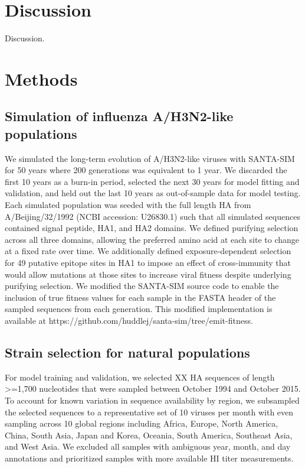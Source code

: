 \section*{Discussion}

Discussion.

\section*{Methods}

\subsection*{Simulation of influenza A/H3N2-like populations}

We simulated the long-term evolution of A/H3N2-like viruses with SANTA-SIM \cite{Jariani2019} for 50 years where 200 generations was equivalent to 1 year.
We discarded the first 10 years as a burn-in period, selected the next 30 years for model fitting and validation, and held out the last 10 years as out-of-sample data for model testing.
Each simulated population was seeded with the full length HA from A/Beijing/32/1992 (NCBI accession: U26830.1) such that all simulated sequences contained signal peptide, HA1, and HA2 domains.
We defined purifying selection across all three domains, allowing the preferred amino acid at each site to change at a fixed rate over time.
We additionally defined exposure-dependent selection for 49 putative epitope sites in HA1 \cite{Luksza:2014hj} to impose an effect of cross-immunity that would allow mutations at those sites to increase viral fitness despite underlying purifying selection.
We modified the SANTA-SIM source code to enable the inclusion of true fitness values for each sample in the FASTA header of the sampled sequences from each generation.
This modified implementation is available at https://github.com/huddlej/santa-sim/tree/emit-fitness.

\subsection*{Strain selection for natural populations}

For model training and validation, we selected XX HA sequences of length >=1,700 nucleotides that were sampled between October 1994 and October 2015.
To account for known variation in sequence availability by region, we subsampled the selected sequences to a representative set of 10 viruses per month with even sampling across 10 global regions including Africa, Europe, North America, China, South Asia, Japan and Korea, Oceania, South America, Southeast Asia, and West Asia.
We excluded all samples with ambiguous year, month, and day annotations and prioritized samples with more available HI titer measurements.

